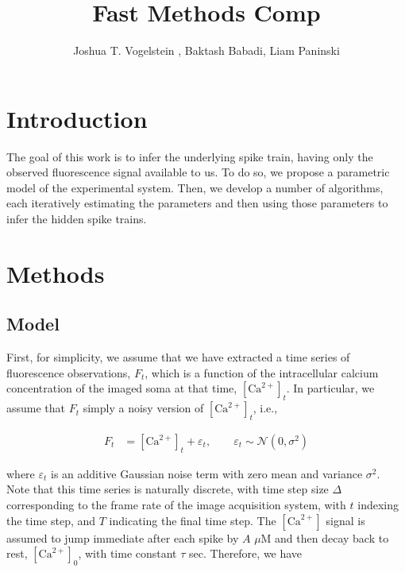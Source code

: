 \documentclass[12pt]{article}
\title{Fast Methods Comp}
\author{Joshua T. Vogelstein%
, Baktash Babadi, Liam Paninski
}
\newcommand{\Ca}{[\text{Ca}^{2+}]}
\begin{document}
\maketitle %
\tableofcontents

\begin{abstract}

\end{abstract}

\section{Introduction}

The goal of this work is to infer the underlying spike train, having only the observed fluorescence signal available to us.  To do so, we propose a parametric model of the experimental system.  Then, we develop a number of algorithms, each iteratively estimating the parameters and then using those parameters to infer the hidden spike trains.  


\section{Methods}
\subsection{Model}

First, for simplicity, we assume that we have extracted a time series of fluorescence observations, $F_t$, which is a function of the intracellular calcium concentration of the imaged soma at that time, $\Ca_t$.  In particular, we assume that $F_t$ simply a noisy version of $\Ca_t$, i.e.,

\begin{align} \label{eq:F_t}
F_t &=  \Ca_t + \varepsilon_t, \qquad \varepsilon_t \sim \mathcal{N}(0,\sigma^2)
\end{align}

\noindent where $\varepsilon_t$ is an additive Gaussian noise term with zero mean and variance $\sigma^2$. Note that this time series is naturally discrete, with time step size $\Delta$ corresponding to the frame rate of the image acquisition system, with $t$ indexing the time step, and $T$ indicating the final time step. The $\Ca$ signal is assumed to jump immediate after each spike by $A$ $\mu$M and then decay back to rest, $\Ca_0$, with time constant $\tau$ sec.  Therefore, we have
\end{document}
